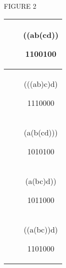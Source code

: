 \documentclass[10pt,letter]{article}
\begin{document}
FIGURE 2
\begin{longtable}[]{@{}ccc@{}}
\toprule\begin{minipage}[b]{0.32\columnwidth}\centering\strut
\strut
\end{minipage} & \begin{minipage}[b]{0.32\columnwidth}\centering\strut
\strut
\end{minipage} & \begin{minipage}[b]{0.32\columnwidth}\centering\strut
((ab(cd))

1100100\strut
\end{minipage}\tabularnewline
\midrule
\endhead\begin{minipage}[t]{0.32\columnwidth}\centering\strut
\strut
\end{minipage} & \begin{minipage}[t]{0.32\columnwidth}\centering\strut
\strut
\end{minipage} & \begin{minipage}[t]{0.32\columnwidth}\centering\strut
(((ab)c)d)

1110000\strut
\end{minipage}\tabularnewline\begin{minipage}[t]{0.32\columnwidth}\centering\strut
\strut
\end{minipage} & \begin{minipage}[t]{0.32\columnwidth}\centering\strut
\strut
\end{minipage} & \begin{minipage}[t]{0.32\columnwidth}\centering\strut
(a(b(cd)))

1010100\strut
\end{minipage}\tabularnewline\begin{minipage}[t]{0.32\columnwidth}\centering\strut
\strut
\end{minipage} & \begin{minipage}[t]{0.32\columnwidth}\centering\strut
\strut
\end{minipage} & \begin{minipage}[t]{0.32\columnwidth}\centering\strut
(a(bc)d))

1011000\strut
\end{minipage}\tabularnewline\begin{minipage}[t]{0.32\columnwidth}\centering\strut
\strut
\end{minipage} & \begin{minipage}[t]{0.32\columnwidth}\centering\strut
\strut
\end{minipage} & \begin{minipage}[t]{0.32\columnwidth}\centering\strut
((a(bc))d)

1101000\strut
\end{minipage}\tabularnewline
\bottomrule

\end{longtable}
\end{document}
